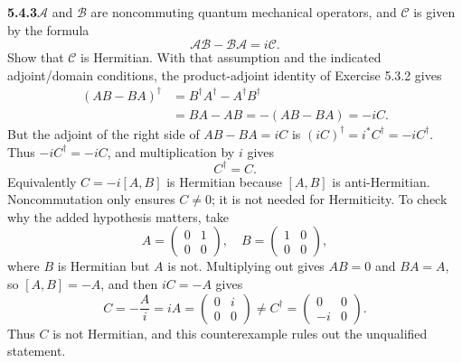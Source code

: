 \par\bigskip
\noindent\textbf{5.4.3}\quad $\mathcal{A}$ and $\mathcal{B}$ are noncommuting
 quantum mechanical operators,
and $\mathcal{C}$ is given by the formula
\[
\mathcal{A}\mathcal{B}-\mathcal{B}\mathcal{A}=i\mathcal{C}.
\]
Show that $\mathcal{C}$ is Hermitian.
\solution
{}
With that assumption and the indicated adjoint/domain conditions, the
product-adjoint identity of Exercise 5.3.2 gives
\begin{align*}
(AB-BA)^\dagger
&=B^\dagger A^\dagger-A^\dagger B^\dagger\\
&=BA-AB=-(AB-BA)=-iC.
\end{align*}
But the adjoint of the right side of $AB-BA=iC$ is
$(iC)^\dagger=i^*C^\dagger=-iC^\dagger$.
Thus $-iC^\dagger=-iC$, and multiplication by $i$ gives
\[
\boxed{C^\dagger=C.}
\]
Equivalently $C=-i[A,B]$ is Hermitian because $[A,B]$ is
anti-Hermitian. Noncommutation only ensures $C\ne0$; it is not needed
for Hermiticity. To check why the added hypothesis matters, take
\[
A=\begin{pmatrix}0&1\\0&0\end{pmatrix},\quad
B=\begin{pmatrix}1&0\\0&0\end{pmatrix},
\]
where $B$ is Hermitian but $A$ is not. Multiplying out gives $AB=0$ and
$BA=A$, so $[A,B]=-A$, and then $iC=-A$ gives
\[
C=-\frac Ai=iA=\begin{pmatrix}0&i\\0&0\end{pmatrix}\ne
C^\dagger=\begin{pmatrix}0&0\\-i&0\end{pmatrix}.
\]
Thus $C$ is not Hermitian, and this counterexample rules out the
unqualified statement.

